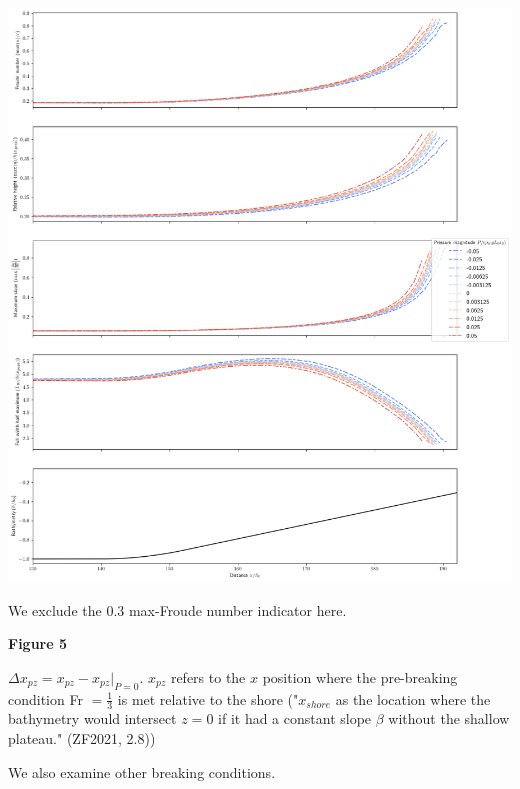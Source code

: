 \documentclass[10pt,a4paper]{article}
\begin{document}
\includegraphics[scale=0.35]{Fig4.png}

We exclude the 0.3 max-Froude number indicator here.
\pagebreak


{\bf\huge Figure 5}

$\Delta x_{pz} = x_{pz} - x_{pz}|_{P=0}$. $x_{pz}$ refers to the $x$ position where the pre-breaking condition Fr $=\frac{1}{3}$ is met relative to the shore ("$x_{shore}$ as the location where the bathymetry would intersect $z=0$ if it had a constant slope $\beta$ without the shallow plateau." (ZF2021, 2.8))
\bigskip

We also examine other breaking conditions.
\end{document}
